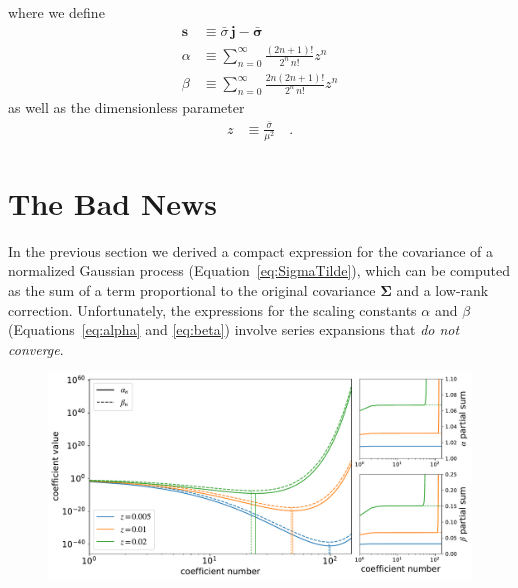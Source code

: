 \documentclass[modern]{aastex62}
\begin{document}
%
where we define
%
\begin{align}
    \mathbf{s}
     & \equiv
    \bar{\sigma} \, \mathbf{j} - \bar{\pmb{\sigma}}
    \\[1em]
    \label{eq:alpha}
    \alpha
     & \equiv
    \sum\limits_{n=0}^\infty
    \frac{(2n + 1)!}{2^n \, n!}
    z^n
    \\[1em]
    \label{eq:beta}
    \beta
     & \equiv
    \sum\limits_{n=0}^\infty
    \frac{2n(2n + 1)!}{2^n \, n!}
    z^n
\end{align}
%
as well as the dimensionless parameter
%
\begin{align}
    z & \equiv \frac{\bar{\sigma}}{\mu^2}
    \quad.
\end{align}

\section{The Bad News}
%
In the previous section we derived a compact expression for
the covariance of a normalized Gaussian process (Equation~\ref{eq:SigmaTilde}),
which can be computed as the sum of a term proportional to the original
covariance $\pmb{\Sigma}$ and a low-rank correction.
%
Unfortunately, the expressions for the scaling constants $\alpha$ and
$\beta$ (Equations~\ref{eq:alpha} and \ref{eq:beta}) involve series
expansions that \emph{do not converge}.
%
\begin{figure}[t!]
    \begin{centering}
        \includegraphics[width=\linewidth]{figures/alpha_beta.pdf}
    \end{centering}
\end{figure}
\end{document}
